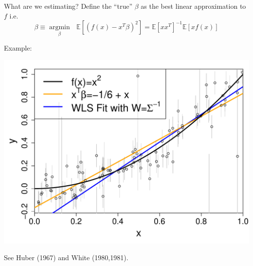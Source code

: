 \documentclass[12pt]{beamer}
\newcommand{\argmin}[1]{\underset{#1}{\operatorname{argmin}}\text{ }}
\newcommand{\E}{\mathbb{E}}
\begin{document}
\begin{frame}{What are we estimating?}
Define the ``true'' $\beta$ as the best linear approximation to $f$ i.e.
  \begin{equation*}
  \beta \equiv \argmin{\beta} \E[(f(x) - x^T\beta)^2] = \E[xx^T]^{-1}\E[xf(x)]
\end{equation*}

Example:

\vspace{-.2in}

\begin{center}
        \includegraphics[scale=0.4]{figs/data.pdf}
  \end{center}

\vspace{-.2in}

See Huber \cite{huber1967behavior} (1967) and White \cite{white1980using,white1981consequences} (1980,1981).

\end{frame}
\end{document}
